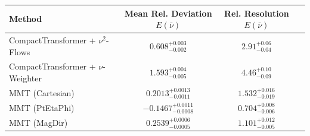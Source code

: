     \begin{tabular}{lccc}
        \toprule
        Method & Mean Rel. Deviation $E(\bar{\nu})$ & Rel. Resolution $E(\bar{\nu})$ \\
        \midrule
        CompactTransformer + $\nu^2$-Flows & $0.608^{+0.003}_{-0.002}$ & $2.91^{+0.06}_{-0.04}$ \\
        CompactTransformer + $\nu$-Weighter & $1.593^{+0.004}_{-0.005}$ & $4.46^{+0.10}_{-0.09}$ \\
        MMT (Cartesian) & $0.2013^{+0.0013}_{-0.0011}$ & $1.532^{+0.016}_{-0.019}$ \\
        MMT (PtEtaPhi) & $-0.1467^{+0.0011}_{-0.0008}$ & $0.704^{+0.008}_{-0.006}$ \\
        MMT (MagDir) & $0.2539^{+0.0006}_{-0.0005}$ & $1.101^{+0.012}_{-0.005}$ \\
        \bottomrule
    \end{tabular}